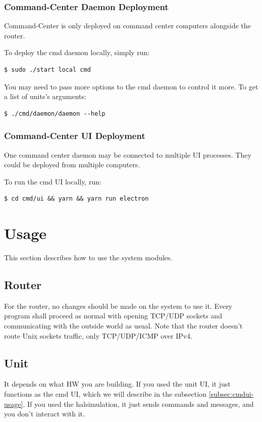 \subsubsection{Command-Center Daemon Deployment}
Command-Center is only deployed on command center computers alongside the router.

To deploy the cmd daemon locally, simply run:
\begin{verbatim}
$ sudo ./start local cmd
\end{verbatim}

You may need to pass more options to the cmd daemon to control it more. 
To get a list of units's arguments:
\begin{verbatim}
$ ./cmd/daemon/daemon --help
\end{verbatim}

\subsubsection{Command-Center UI Deployment}
One command center daemon may be connected to multiple UI processes.
They could be deployed from multiple computers.

To run the cmd UI locally, run:
\begin{verbatim}
$ cd cmd/ui && yarn && yarn run electron
\end{verbatim}

\section{Usage}
\label{sec:usage}
This section describes how to use the system modules.

\subsection{Router}
For the router, no changes should be made on the system to use it.
Every program shall proceed as normal with opening TCP/UDP sockets and communicating with the outside world as usual.
Note that the router doesn't route Unix sockets traffic, only TCP/UDP/ICMP over IPv4.

\subsection{Unit}
It depends on what HW you are building.
If you used the unit UI, it just functions as the cmd UI, which we will describe in the subsection \ref{subsec:cmdui-usage}.
If you used the halsimulation, it just sends commands and messages, and you don't interact with it.

